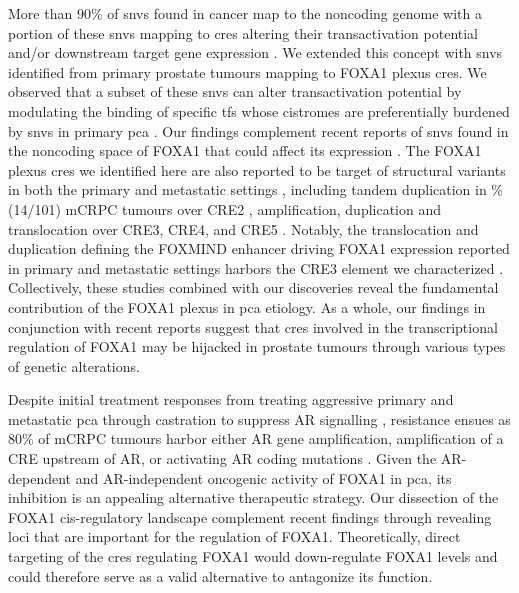 More than 90\% of \glspl{snv} found in cancer map to the noncoding genome \cite{meltonRecurrentSomaticMutations2015,mazrooeiCistromePartitioningReveals2019} with a portion of these \glspl{snv} mapping to \glspl{cre} altering their transactivation potential \cite{baileyNoncodingSomaticInherited2016,zhangIntegrativeFunctionalGenomics2012,huangHighlyRecurrentTERT2013,hornTERTPromoterMutations2013} and/or downstream target gene expression \cite{zhouEmergenceNoncodingCancer2016,meltonRecurrentSomaticMutations2015,weinholdGenomewideAnalysisNoncoding2014}.
We extended this concept with \glspl{snv} identified from primary prostate tumours mapping to FOXA1 plexus \glspl{cre}.
We observed that a subset of these \glspl{snv} can alter transactivation potential by modulating the binding of specific \glspl{tf} whose cistromes are preferentially burdened by \glspl{snv} in primary \gls{pca} \cite{mazrooeiCistromePartitioningReveals2019}.
Our findings complement recent reports of \glspl{snv} found in the noncoding space of FOXA1 that could affect its expression \cite{annalaFrequentMutationFOXA12018,camcapstudygroupSequencingProstateCancers2018}.
The FOXA1 plexus \glspl{cre} we identified here are also reported to be target of structural variants in both the primary and metastatic settings \cite{paroliaDistinctStructuralClasses2019,quigleyGenomicHallmarksStructural2018}, including tandem duplication in \% (14/101) mCRPC tumours over CRE2 \cite{quigleyGenomicHallmarksStructural2018}, amplification, duplication and translocation over CRE3, CRE4, and CRE5 \cite{paroliaDistinctStructuralClasses2019}.
Notably, the translocation and duplication defining the FOXMIND enhancer driving FOXA1 expression reported in primary and metastatic settings harbors the CRE3 element we characterized \cite{paroliaDistinctStructuralClasses2019}.
Collectively, these studies combined with our discoveries reveal the fundamental contribution of the FOXA1 plexus in \gls{pca} etiology.
As a whole, our findings in conjunction with recent reports suggest that \glspl{cre} involved in the transcriptional regulation of FOXA1 may be hijacked in prostate tumours through various types of genetic alterations.

Despite initial treatment responses from treating aggressive primary and metastatic \gls{pca} through castration to suppress AR signalling \cite{attardProstateCancer2016}, resistance ensues as 80\% of mCRPC tumours harbor either AR gene amplification, amplification of a CRE upstream of AR, or activating AR coding mutations \cite{robinsonIntegrativeClinicalGenomics2015,takedaSomaticallyAcquiredEnhancer2018,quigleyGenomicHallmarksStructural2018}.
Given the AR-dependent \cite{yangCurrentPerspectivesFOXA12015,pomerantzAndrogenReceptorCistrome2015} and AR-independent \cite{sunkelIntegrativeAnalysisIdentifies2017} oncogenic activity of FOXA1 in \gls{pca}, its inhibition is an appealing alternative therapeutic strategy.
Our dissection of the FOXA1 cis-regulatory landscape complement recent findings through revealing loci that are important for the regulation of FOXA1.
Theoretically, direct targeting of the \glspl{cre} regulating FOXA1 would down-regulate FOXA1 levels and could therefore serve as a valid alternative to antagonize its function.

